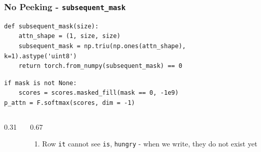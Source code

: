 \documentclass{beamer}
\begin{document}
\begin{frame}[fragile]
  \frametitle{No Peeking - \texttt{subsequent\_mask}}
\begin{lstlisting}[basicstyle=\ttfamily\tiny, aboveskip=2pt, belowskip=2pt]
def subsequent_mask(size):
    attn_shape = (1, size, size)
    subsequent_mask = np.triu(np.ones(attn_shape), k=1).astype('uint8')
    return torch.from_numpy(subsequent_mask) == 0
\end{lstlisting}
\begin{lstlisting}[basicstyle=\ttfamily\tiny, aboveskip=2pt, belowskip=2pt]
if mask is not None:
    scores = scores.masked_fill(mask == 0, -1e9)
p_attn = F.softmax(scores, dim = -1)
\end{lstlisting}
  \begin{columns}[T]
    \begin{column}{0.31\textwidth}
      \centering
    \end{column}
    \begin{column}{0.67\textwidth}
      \begin{enumerate}
        \item<2-> Row \textcolor{itcolor}{\texttt{it}} cannot see \texttt{is}, \texttt{hungry} - when we write, they do not exist yet
      \end{enumerate}
    \end{column}
  \end{columns}
  \vfill
\end{frame}
\end{document}
